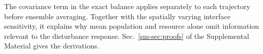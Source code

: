 The covariance term in the exact balance applies separately to each trajectory before ensemble averaging. Together with the spatially varying interface sensitivity, it explains why mean population and resource alone omit information relevant to the disturbance response. Sec.~\ref{sm-sec:proofs} of the Supplemental Material gives the derivations.
